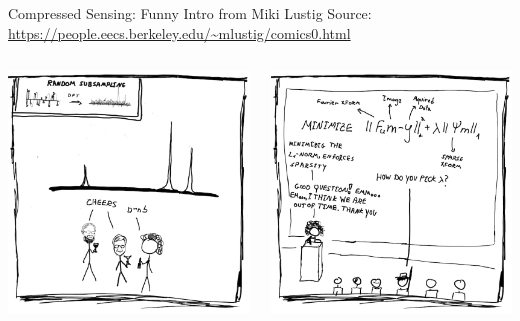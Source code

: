 \documentclass[aspectratio=169]{beamer}
\begin{document}
	\begin{frame}{Compressed Sensing: Funny Intro from Miki Lustig}
		Source: \url{https://people.eecs.berkeley.edu/~mlustig/comics0.html}
		\vspace{1em}
		\begin{columns}
			\centering
			\includegraphics[width=\columnwidth]{figures/cs-lustig-comics-23.png}
			
			\centering
			\includegraphics[width=\columnwidth]{figures/cs-lustig-comics-24.png}
		\end{columns}
	\end{frame}
	
\end{document}

